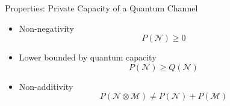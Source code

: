 \begin{frame}{Properties: Private Capacity of a Quantum Channel}
\begin{itemize}
    \setlength{\itemsep}{1.5em}
    \item Non-negativity
    $$P(\mathcal{N}) \geq 0$$
    \item Lower bounded by quantum capacity
    $$P(\mathcal{N}) \geq Q(\mathcal{N})$$
    \item Non-additivity
    $$P(\mathcal{N} \otimes \mathcal{M}) \neq P(\mathcal{N}) + P(\mathcal{M})$$
\end{itemize}
\end{frame}
